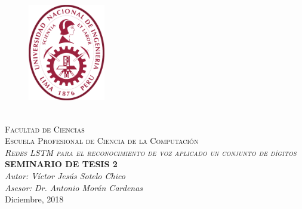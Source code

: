 \documentclass[12pt,spanish, singlespacing,]{MastersDoctoralThesis}
\author{}
\newcommand\blankpage{%
    \null
    \thispagestyle{empty}%
    \addtocounter{page}{0}%
    \newpage}
\begin{document}
\frontmatter 
\pagestyle{plain} 
\begin{titlepage}
\begin{center}

\begin{figure}[h]
\centering
\includegraphics[width=0.3\textwidth]{Figures/log_uni.png}
\end{figure}

\textsc{\huge \univname}\\[0.3cm]
\textsc{\Large Facultad de Ciencias}\\[0.2cm]
\textsc{\large Escuela Profesional de Ciencia de la Computaci\'on}\\[2cm]
\textsc{\LARGE \textit{Redes LSTM para el reconocimiento de voz aplicado un conjunto de dígitos}}\\[2cm] 
{\Large \textbf{SEMINARIO DE TESIS 2}}
{\huge \bfseries \ttitle}\\[2cm] 

\bigskip
\bigskip
\large\emph{Autor: Víctor Jesús Sotelo Chico}
{\authorname}\\ 
\large\emph{Asesor: Dr. Antonio Morán Cardenas}
{\supname} 
\\[1cm]
{\large Diciembre, 2018}\\[4cm] 
 
\vfill
\end{center}
\end{titlepage}
\afterpage{\blankpage}
\end{document}
